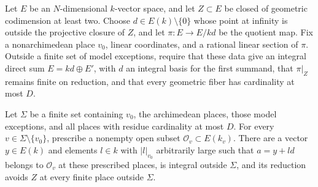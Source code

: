 \begin{lemma}\label{lem:foundations-affine-sieve}
Let \(E\) be an \(N\)-dimensional \(k\)-vector space, and let
\(Z\subset E\) be closed of geometric codimension at least two.
Choose \(d\in E(k)\setminus\{0\}\) whose point at infinity is outside
the projective closure of \(Z\), and let
\(\pi:E\to E/kd\) be the quotient map.  Fix a nonarchimedean place
\(v_0\), linear coordinates, and a rational linear section of \(\pi\).
Outside a finite set of model exceptions, require that these data
give an integral direct sum \(E=kd\oplus E'\), with \(d\) an integral
basis for the first summand, that \(\pi|_Z\) remains finite on
reduction, and that every geometric fiber has cardinality at most
\(D\).

Let \(\Sigma\) be a finite set containing \(v_0\), the archimedean
places, those model exceptions, and all places with residue
cardinality at most \(D\).  For every
\(v\in\Sigma\setminus\{v_0\}\), prescribe a nonempty open subset
\(\mathcal O_v\subset E(k_v)\).
There are a vector \(y\in E(k)\) and elements \(l\in k\) with
\(|l|_{v_0}\) arbitrarily large such that \(a=y+ld\) belongs to
\(\mathcal O_v\) at these prescribed places, is integral outside
\(\Sigma\), and its reduction avoids \(Z\) at every finite place
outside \(\Sigma\).
\end{lemma}

